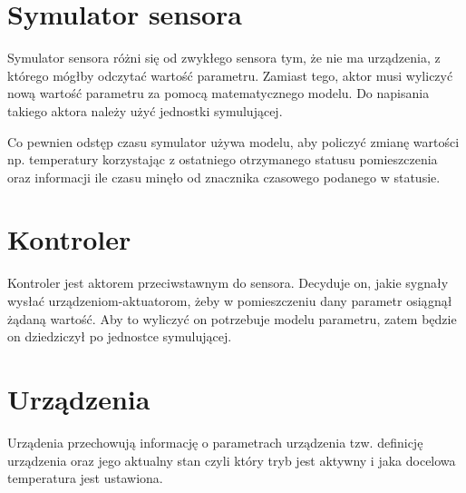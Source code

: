 \section{Symulator sensora}
Symulator sensora różni się od zwykłego sensora tym, że nie ma urządzenia, z którego mógłby odczytać wartość parametru. 
Zamiast tego, aktor musi wyliczyć nową wartość parametru za pomocą matematycznego modelu. Do napisania takiego aktora należy użyć jednostki symulującej.  

Co pewnien odstęp czasu symulator używa modelu, aby policzyć zmianę wartości np. temperatury korzystając z ostatniego otrzymanego statusu pomieszczenia oraz informacji ile czasu minęło od znacznika czasowego podanego w statusie.

\section{Kontroler}
Kontroler jest aktorem przeciwstawnym do sensora. Decyduje on, jakie sygnały wysłać urządzeniom-aktuatorom, żeby w pomieszczeniu dany parametr osiągnął żądaną wartość.
Aby to wyliczyć on potrzebuje modelu parametru, zatem będzie on dziedziczył po jednostce symulującej. 

\section{Urządzenia}
Urządenia przechowują informację o parametrach urządzenia tzw. definicję urządzenia oraz jego aktualny stan czyli który tryb jest aktywny i jaka docelowa temperatura jest ustawiona. 